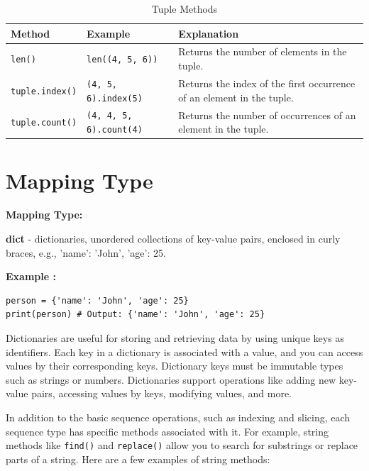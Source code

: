 \documentclass[12pt]{book}
\newtheorem{Example}{Example}[chapter]
\renewenvironment{Example}{\begin{trivlist}\item\relax
\textbf{Example \thesection: }}{\end{trivlist}}
\begin{document}
\begin{table}[h]
\centering
\caption{Tuple Methods}
\label{tab:tuple-methods}
\begin{tabular}{|l|l|p{7cm}|}
\hline
\textbf{Method} & \textbf{Example} & \textbf{Explanation} \\
\hline
\texttt{len()} & \texttt{len((4, 5, 6))} & Returns the number of elements in the tuple. \\
\hline
\texttt{tuple.index()} & \texttt{(4, 5, 6).index(5)} & Returns the index of the first occurrence of an element in the tuple. \\
\hline
\texttt{tuple.count()} & \texttt{(4, 4, 5, 6).count(4)} & Returns the number of occurrences of an element in the tuple. \\
\hline
\end{tabular}
\end{table}

\section{Mapping Type}
\textbf{Mapping Type:}
\begin{itemize}
\item \textbf{dict} - dictionaries, unordered collections of key-value pairs, enclosed in curly braces, e.g., {'name': 'John', 'age': 25}.
\begin{Example}
\begin{lstlisting}
person = {'name': 'John', 'age': 25}
print(person) # Output: {'name': 'John', 'age': 25}
\end{lstlisting}
\end{Example}
Dictionaries are useful for storing and retrieving data by using unique keys as identifiers. Each key in a dictionary is associated with a value, and you can access values by their corresponding keys. Dictionary keys must be immutable types such as strings or numbers. Dictionaries support operations like adding new key-value pairs, accessing values by keys, modifying values, and more.
\end{itemize}

In addition to the basic sequence operations, such as indexing and slicing, each sequence type has specific methods associated with it. For example, string methods like \texttt{find()} and \texttt{replace()} allow you to search for substrings or replace parts of a string. Here are a few examples of string methods:
\end{document}
